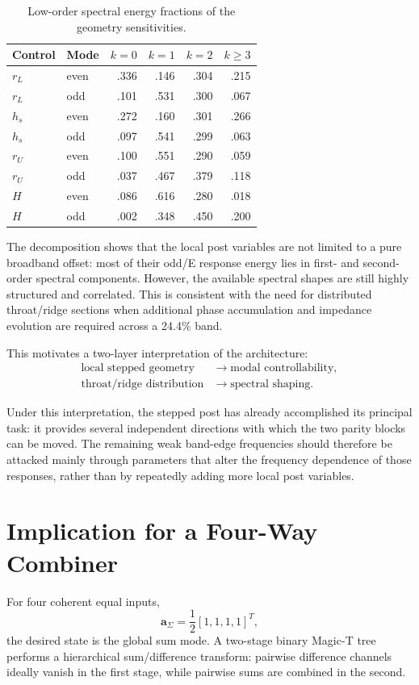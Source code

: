 \documentclass[journal]{IEEEtran}
\begin{document}
\begin{table}[t]
\centering
\caption{Low-order spectral energy fractions of the geometry sensitivities.}
\label{tab:spectral-energy}
\begin{tabular}{llrrrr}
\toprule
Control & Mode & $k=0$ & $k=1$ & $k=2$ & $k\ge3$\\
\midrule
$r_L$ & even & .336 & .146 & .304 & .215\\
$r_L$ & odd  & .101 & .531 & .300 & .067\\
$h_s$ & even & .272 & .160 & .301 & .266\\
$h_s$ & odd  & .097 & .541 & .299 & .063\\
$r_U$ & even & .100 & .551 & .290 & .059\\
$r_U$ & odd  & .037 & .467 & .379 & .118\\
$H$   & even & .086 & .616 & .280 & .018\\
$H$   & odd  & .002 & .348 & .450 & .200\\
\bottomrule
\end{tabular}
\end{table}

The decomposition shows that the local post variables are not limited to a pure broadband offset: most of their odd/E response energy lies in first- and second-order spectral components.  However, the available spectral shapes are still highly structured and correlated.  This is consistent with the need for distributed throat/ridge sections when additional phase accumulation and impedance evolution are required across a 24.4\% band.

This motivates a two-layer interpretation of the architecture:
\begin{align}
\text{local stepped geometry}&\rightarrow\text{modal controllability},\\
\text{throat/ridge distribution}&\rightarrow\text{spectral shaping}.
\end{align}

Under this interpretation, the stepped post has already accomplished its principal task: it provides several independent directions with which the two parity blocks can be moved.
The remaining weak band-edge frequencies should therefore be attacked mainly through parameters that alter the frequency dependence of those responses, rather than by repeatedly adding more local post variables.

\section{Implication for a Four-Way Combiner}
For four coherent equal inputs,
\begin{equation}
\bm a_\Sigma=\frac12[1,1,1,1]^T,
\end{equation}
the desired state is the global sum mode.
A two-stage binary Magic-T tree performs a hierarchical sum/difference transform: pairwise difference channels ideally vanish in the first stage, while pairwise sums are combined in the second.
\end{document}
